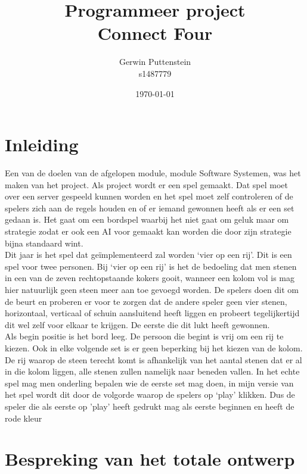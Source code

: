 \documentclass[12pt]{article}
\begin{document}
\title{Programmeer project\\Connect Four}
\author{Gerwin Puttenstein\\s1487779}
\date{\today}
\maketitle
\newpage
\tableofcontents
\newpage
\section{Inleiding}
Een van de doelen van de afgelopen module, module Software Systemen, was het maken van het project. Als project wordt er een spel gemaakt. Dat spel moet over een server gespeeld kunnen worden en het spel moet zelf controleren of de spelers zich aan de regels houden en of er iemand gewonnen heeft als er een set gedaan is. Het gaat om een bordspel waarbij het niet gaat om geluk maar om strategie zodat er ook een AI voor gemaakt kan worden die door zijn strategie bijna standaard wint.\\
Dit jaar is het spel dat ge\"implementeerd zal worden `vier op een rij'. Dit is een spel voor twee personen. Bij `vier op een rij' is het de bedoeling dat men stenen in een van de zeven rechtopstaande kokers gooit, wanneer een kolom vol is mag hier natuurlijk geen steen meer aan toe gevoegd worden. De spelers doen dit om de beurt en proberen er voor te zorgen dat de andere speler geen vier stenen, horizontaal, verticaal of schuin aansluitend heeft liggen en probeert tegelijkertijd dit wel zelf voor elkaar te krijgen. De eerste die dit lukt heeft gewonnen.\\
Als begin positie is het bord leeg. De persoon die begint is vrij om een rij te kiezen. Ook in elke volgende set is er geen beperking bij het kiezen van de kolom. De rij waarop de steen terecht komt is afhankelijk van het aantal stenen dat er al in die kolom liggen, alle stenen zullen namelijk naar beneden vallen. In het echte spel mag men onderling bepalen wie de eerste set mag doen, in mijn versie van het spel wordt dit door de volgorde waarop de spelers op `play' klikken. Dus de speler die als eerste op 'play' heeft gedrukt mag als eerste beginnen en heeft de rode kleur\\
\newpage 
\section{Bespreking van het totale ontwerp}
\end{document}
